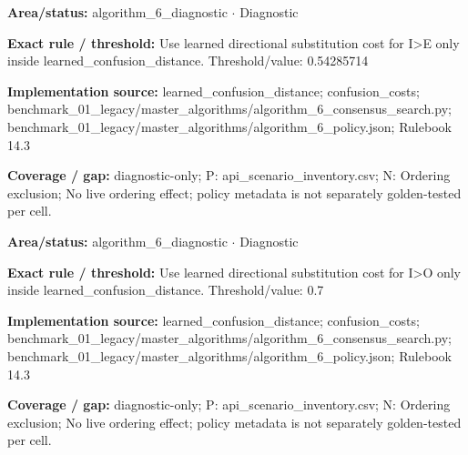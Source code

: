 \begin{tcolorbox}[enhanced,breakable,colback=white,colframe=Muted!45,boxrule=0.45pt,arc=1.5pt,left=6pt,right=6pt,top=5pt,bottom=5pt,title={\texttt{A6-LEARNED-SUBSTITUTION-I-E}},title after break={\texttt{A6-LEARNED-SUBSTITUTION-I-E}\ (continued)},fonttitle=\headingfont\bfseries\color{Navy},coltitle=Navy]
\textbf{Area/status:} algorithm\_\allowbreak{}6\_\allowbreak{}diagnostic $\boldsymbol{\cdot}$ Diagnostic\par
\smallskip
\textbf{Exact rule / threshold:} Use learned directional substitution cost for I>E only inside learned\_\allowbreak{}confusion\_\allowbreak{}distance. Threshold/\allowbreak{}value: 0.54285714\par
\smallskip
\textbf{Implementation source:} learned\_\allowbreak{}confusion\_\allowbreak{}distance; confusion\_\allowbreak{}costs; benchmark\_\allowbreak{}01\_\allowbreak{}legacy/\allowbreak{}master\_\allowbreak{}algorithms/\allowbreak{}algorithm\_\allowbreak{}6\_\allowbreak{}consensus\_\allowbreak{}search.py; benchmark\_\allowbreak{}01\_\allowbreak{}legacy/\allowbreak{}master\_\allowbreak{}algorithms/\allowbreak{}algorithm\_\allowbreak{}6\_\allowbreak{}policy.json; Rulebook 14.3\par
\smallskip
\textbf{Coverage / gap:} diagnostic-only; P: api\_\allowbreak{}scenario\_\allowbreak{}inventory.csv; N: Ordering exclusion; No live ordering effect; policy metadata is not separately golden-tested per cell.
\end{tcolorbox}
\begin{tcolorbox}[enhanced,breakable,colback=white,colframe=Muted!45,boxrule=0.45pt,arc=1.5pt,left=6pt,right=6pt,top=5pt,bottom=5pt,title={\texttt{A6-LEARNED-SUBSTITUTION-I-O}},title after break={\texttt{A6-LEARNED-SUBSTITUTION-I-O}\ (continued)},fonttitle=\headingfont\bfseries\color{Navy},coltitle=Navy]
\textbf{Area/status:} algorithm\_\allowbreak{}6\_\allowbreak{}diagnostic $\boldsymbol{\cdot}$ Diagnostic\par
\smallskip
\textbf{Exact rule / threshold:} Use learned directional substitution cost for I>O only inside learned\_\allowbreak{}confusion\_\allowbreak{}distance. Threshold/\allowbreak{}value: 0.7\par
\smallskip
\textbf{Implementation source:} learned\_\allowbreak{}confusion\_\allowbreak{}distance; confusion\_\allowbreak{}costs; benchmark\_\allowbreak{}01\_\allowbreak{}legacy/\allowbreak{}master\_\allowbreak{}algorithms/\allowbreak{}algorithm\_\allowbreak{}6\_\allowbreak{}consensus\_\allowbreak{}search.py; benchmark\_\allowbreak{}01\_\allowbreak{}legacy/\allowbreak{}master\_\allowbreak{}algorithms/\allowbreak{}algorithm\_\allowbreak{}6\_\allowbreak{}policy.json; Rulebook 14.3\par
\smallskip
\textbf{Coverage / gap:} diagnostic-only; P: api\_\allowbreak{}scenario\_\allowbreak{}inventory.csv; N: Ordering exclusion; No live ordering effect; policy metadata is not separately golden-tested per cell.
\end{tcolorbox}
